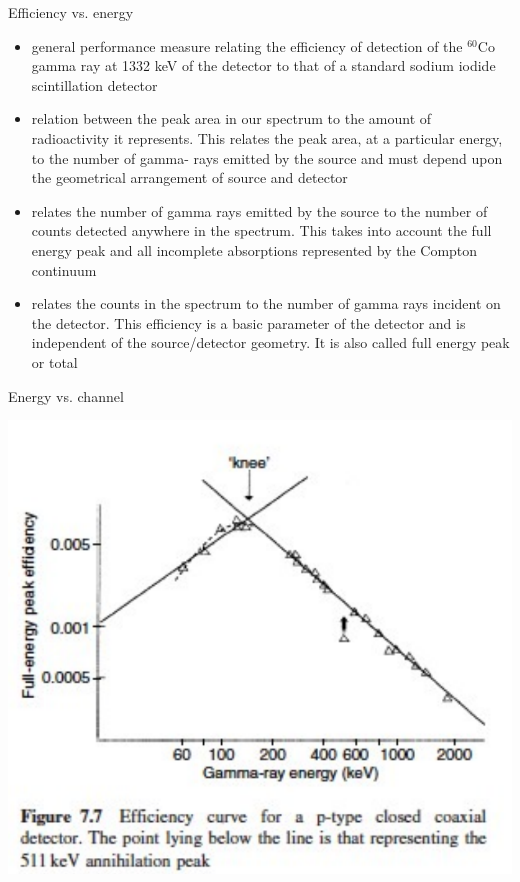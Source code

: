 \begin{frame}{Efficiency vs. energy}

\begin{flushright}

\begin{minipage}{0.7\textwidth}
{\scriptsize 
\begin{itemize}
\item[Relative efficiency] general performance measure relating the efficiency of detection of the $^{60}$Co gamma ray at 1332 keV of the detector to that of a standard sodium iodide scintillation detector
\item[Absolute full energy peak] relation between the peak area in our spectrum to the amount of radioactivity it represents. This relates the peak area, at a particular energy, to the number of gamma- rays emitted by the source and must depend upon the geometrical arrangement of source and detector
\item[Absolute total efficiency] relates the number of gamma rays emitted by the source to the number of counts detected anywhere in the spectrum. This takes into account the full energy peak and all incomplete absorptions represented by the Compton continuum
\item[Intrinsic efficiency] relates the counts in the spectrum to the number of gamma rays incident on the detector. This efficiency is a basic parameter of the detector and is independent of the source/detector geometry. It is also called full energy peak or total
\end{itemize}
}
\end{minipage}
\end{flushright}

\end{frame}

\begin{frame}{Energy vs. channel}

\centering
\includegraphics[scale=0.3]{figures/efficiency_energy.png}

\end{frame}

